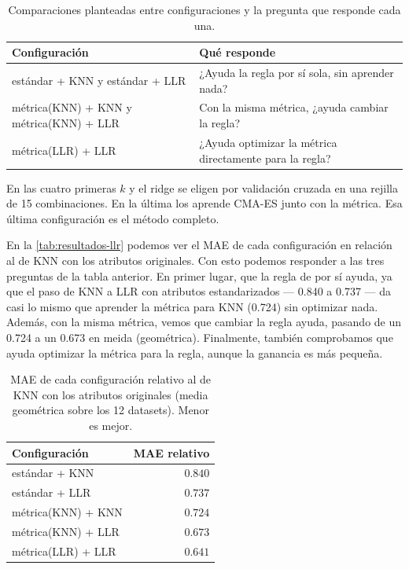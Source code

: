 \begin{table}[h]
\centering
\begin{tabular}{p{5.5cm}p{7.5cm}}
\hline
\textbf{Configuración} & \textbf{Qué responde} \\
\hline
estándar + KNN y estándar + LLR & ¿Ayuda la regla por sí sola, sin aprender nada? \\
\hline
métrica(KNN) + KNN y métrica(KNN) + LLR & Con la misma métrica, ¿ayuda cambiar la regla? \\
\hline
métrica(LLR) + LLR & ¿Ayuda optimizar la métrica directamente para la regla? \\
\hline
\end{tabular}
\caption{Comparaciones planteadas entre configuraciones y la pregunta que responde cada una.}
\label{tab:comparaciones}
\end{table}

En las cuatro primeras $k$ y el ridge se eligen por validación cruzada en una rejilla de 15 combinaciones. En la última los aprende CMA-ES junto con la métrica. Esa última configuración es el método completo. 

En la \autoref{tab:resultados-llr} podemos ver el MAE de cada configuración en relación al de KNN con los atributos originales. Con esto podemos responder a las tres preguntas de la tabla anterior. En primer lugar, que la regla de por sí ayuda, ya que el paso de KNN a LLR con atributos estandarizados --- 0.840 a 0.737 --- da casi lo mismo que aprender la métrica para KNN (0.724) sin optimizar nada. Además, con la misma métrica, vemos que cambiar la regla ayuda, pasando de un 0.724 a un 0.673 en meida (geométrica). Finalmente, también comprobamos que ayuda optimizar la métrica para la regla, aunque la ganancia es más pequeña.

\begin{table}[h]
\centering
\begin{tabular}{lr}
\hline
\textbf{Configuración} & \textbf{MAE relativo} \\
\hline
estándar + KNN      & $0.840$ \\
estándar + LLR      & $0.737$ \\
métrica(KNN) + KNN  & $0.724$ \\
métrica(KNN) + LLR  & $0.673$ \\
métrica(LLR) + LLR  & $\mathbf{0.641}$ \\
\hline
\end{tabular}
\caption{MAE de cada configuración relativo al de KNN con los atributos originales (media geométrica sobre los 12 datasets). Menor es mejor.}
\label{tab:resultados-llr}
\end{table}

